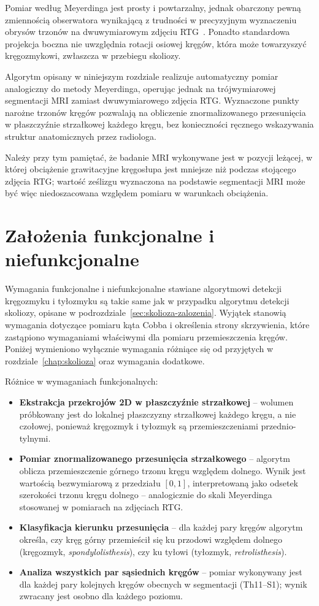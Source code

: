 Pomiar według Meyerdinga jest prosty i powtarzalny, jednak obarczony pewną zmiennością obserwatora wynikającą z trudności w precyzyjnym wyznaczeniu obrysów trzonów na dwuwymiarowym zdjęciu RTG~\cite{tallroth}.
Ponadto standardowa projekcja boczna nie uwzględnia rotacji osiowej kręgów, która może towarzyszyć kręgozmykowi, zwłaszcza w przebiegu skoliozy.

Algorytm opisany w niniejszym rozdziale realizuje automatyczny pomiar analogiczny do metody Meyerdinga, operując jednak na trójwymiarowej segmentacji MRI zamiast dwuwymiarowego zdjęcia RTG.
Wyznaczone punkty narożne trzonów kręgów pozwalają na obliczenie znormalizowanego przesunięcia w płaszczyźnie strzałkowej każdego kręgu, bez konieczności ręcznego wskazywania struktur anatomicznych przez radiologa.

Należy przy tym pamiętać, że badanie MRI wykonywane jest w pozycji leżącej, w której obciążenie grawitacyjne kręgosłupa jest mniejsze niż podczas stojącego zdjęcia RTG; wartość ześlizgu wyznaczona na podstawie segmentacji MRI może być więc niedoszacowana względem pomiaru w warunkach obciążenia.

\section{Założenia funkcjonalne i niefunkcjonalne}

Wymagania funkcjonalne i niefunkcjonalne stawiane algorytmowi detekcji kręgozmyku i tyłozmyku są takie same jak w przypadku algorytmu detekcji skoliozy, opisane w podrozdziale~\ref{sec:skolioza-zalozenia}.
Wyjątek stanowią wymagania dotyczące pomiaru kąta Cobba i określenia strony skrzywienia, które zastąpiono wymaganiami właściwymi dla pomiaru przemieszczenia kręgów.
Poniżej wymieniono wyłącznie wymagania różniące się od przyjętych w rozdziale~\ref{chap:skolioza} oraz wymagania dodatkowe.

Różnice w wymaganiach funkcjonalnych:

\begin{itemize}
    \item \textbf{Ekstrakcja przekrojów 2D w płaszczyźnie strzałkowej} -- wolumen próbkowany jest do lokalnej płaszczyzny strzałkowej każdego kręgu, a nie czołowej, ponieważ kręgozmyk i tyłozmyk są przemieszczeniami przednio-tylnymi.
    \item \textbf{Pomiar znormalizowanego przesunięcia strzałkowego} -- algorytm oblicza przemieszczenie górnego trzonu kręgu względem dolnego.
    Wynik jest wartością bezwymiarową z przedziału $[0, 1]$, interpretowaną jako odsetek szerokości trzonu kręgu dolnego -- analogicznie do skali Meyerdinga stosowanej w pomiarach na zdjęciach RTG.
    \item \textbf{Klasyfikacja kierunku przesunięcia} -- dla każdej pary kręgów algorytm określa, czy kręg górny przemieścił się ku przodowi względem dolnego (kręgozmyk, \textit{spondylolisthesis}), czy ku tyłowi (tyłozmyk, \textit{retrolisthesis}).
    \item \textbf{Analiza wszystkich par sąsiednich kręgów} -- pomiar wykonywany jest dla każdej pary kolejnych kręgów obecnych w segmentacji (Th11--S1); wynik zwracany jest osobno dla każdego poziomu.
\end{itemize}

